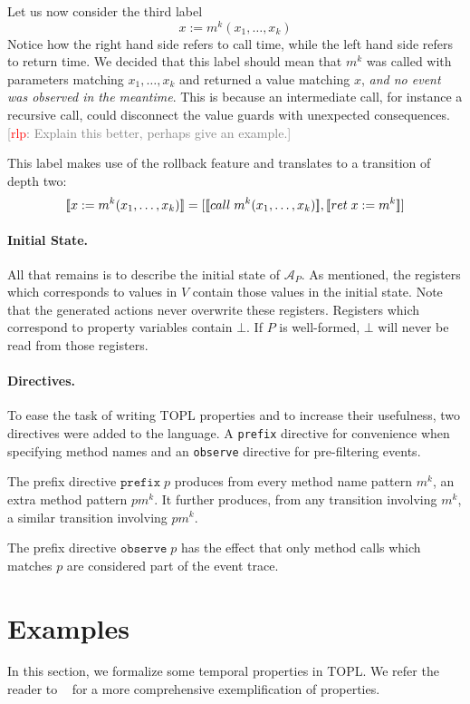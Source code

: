 \documentclass[9pt, preprint]{sigplanconf} %
\newcommand{\noterg}[2]{\textcolor{gray}{[\textcolor{red}{#1}: #2]}}
\newcommand{\rlp}[1]{\noterg{rlp}{#1}}
\newcommand{\A}{\ensuremath{\mathcal{A}}}
\theoremstyle{definition}
\theoremstyle{remark}
\begin{document}
Let us now consider the third label
\[
x := m^k(x_1, \ldots, x_k)
\]
Notice how the right hand side refers to call time, while the left
hand side refers to return time. We decided that this label should
mean that $m^k$ was called with parameters matching $x_1, \ldots, x_k$
and returned a value matching $x$, \emph{and no event was observed in
  the meantime}. This is because an intermediate call, for instance a
recursive call, could disconnect the value guards with unexpected
consequences. \rlp{Explain this better, perhaps give an example.}

This label makes use of the rollback feature and translates to a
transition of depth two:
\[
[\![x := m^k(x_1, \ldots, x_k)]\!]
=
[[\![call\;m^k(x_1, \ldots, x_k)]\!], [\![ret\;x := m^k]\!]]
\]

\paragraph{Initial State.}
All that remains is to describe the initial state of $\A_P$.
As mentioned, the registers which corresponds to values in $V$
contain those values in the initial state. Note that the generated
actions never overwrite these registers. Registers which correspond
to property variables contain $\bot$. If $P$ is well-formed, $\bot$
will never be read from those registers.

\paragraph{Directives.}
To ease the task of writing TOPL properties and to increase their
usefulness, two directives were added to the language. A \texttt{prefix}
directive for convenience when specifying method names and an
\texttt{observe} directive for pre-filtering events.

The prefix directive $\mathtt{prefix}\; p$ produces from every
method name pattern $m^k$, an extra method pattern $pm^k$. It further
produces, from any transition involving $m^k$, a similar transition
involving $pm^k$.

The prefix directive $\mathtt{observe}\; p$ has the effect that only
method calls which matches $p$ are considered part of the event trace.

\section{Examples} \label{sec:examples} %

In this section, we formalize some temporal properties in TOPL. We refer the reader to ~\cite{our-fool2011} for a more comprehensive
exemplification of properties.
\end{document}
